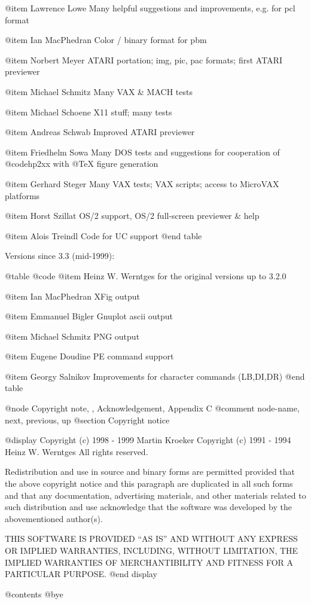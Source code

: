 @item Lawrence Lowe
Many helpful suggestions and improvements, e.g. for pcl format

@item Ian MacPhedran
Color / binary format for pbm

@item Norbert Meyer
ATARI portation; img, pic, pac formats; first ATARI previewer

@item Michael Schmitz
Many VAX & MACH tests

@item Michael Schoene
X11 stuff; many tests

@item Andreas Schwab
Improved ATARI previewer

@item Friedhelm Sowa
Many DOS tests and suggestions for cooperation of @code{hp2xx} with
@TeX{} figure generation

@item Gerhard Steger
Many VAX tests; VAX scripts; access to MicroVAX platforms

@item Horst Szillat
OS/2 support, OS/2 full-screen previewer & help

@item Alois Treindl
Code for UC support
@end table

Versions since 3.3 (mid-1999):

@table @code
@item Heinz W. Werntges 
for the original versions up to 3.2.0

@item Ian MacPhedran
XFig output

@item Emmanuel Bigler
Gnuplot ascii output

@item Michael Schmitz
PNG output

@item Eugene Doudine
PE command support

@item Georgy Salnikov 
Improvements for character commands (LB,DI,DR)
@end table



@node Copyright note, , Acknowledgement, Appendix C
@comment  node-name,  next,  previous,  up
@section Copyright notice

@display
Copyright (c) 1998 - 1999  Martin Kroeker
Copyright (c) 1991 - 1994  Heinz W. Werntges
All rights reserved.

Redistribution and use in source and binary forms are permitted provided that
the above copyright notice and this paragraph are duplicated in all such forms
and that any documentation, advertising materials, and other materials related
to such distribution and use acknowledge that the software was developed
by the abovementioned author(s).

THIS SOFTWARE IS PROVIDED ``AS IS'' AND WITHOUT ANY EXPRESS
OR IMPLIED WARRANTIES, INCLUDING, WITHOUT LIMITATION,
THE IMPLIED WARRANTIES OF MERCHANTIBILITY AND FITNESS
FOR A PARTICULAR PURPOSE.
@end display

@contents
@bye

